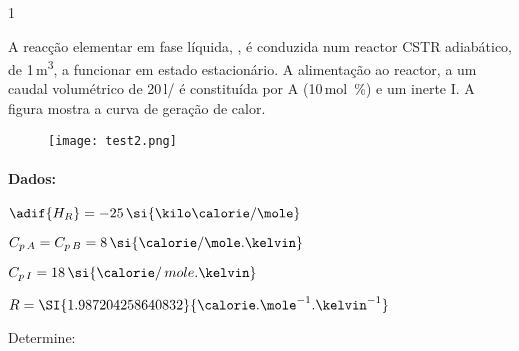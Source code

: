 \documentclass[\mainfilename]{subfiles}
\begin{document}
\begin{questionBox}1{ %
    A reacção elementar em fase líquida, , é conduzida num reactor CSTR adiabático, de 1\,\si{\metre^3}, a funcionar em estado estacionário. A alimentação ao reactor, a um caudal volumétrico de 20\,\si{\litre/\min} é constituída por A (10\,\si{\mole\percent}) e um inerte I. A figura mostra a curva de geração de calor.
    \begin{figure}\centering
        \texttt{[image: test2.png]}
    \end{figure}
} %
    \paragraph*{Dados:}
    \begin{itemize}
        \begin{multicols}{2}
            \vspace{-2ex}
            \item \(\adif{H_R}=-25\,\si{\kilo\calorie/\mole}\)
            \item \(C_{p\,A}=C_{p\,B}=8\,\si{\calorie/\mole.\kelvin}\)
            \item \(C_{p\,I}=18\,\si{\calorie/\,mole.\kelvin}\)
            \item \(R=\SI{1.987204258640832}{\calorie.\mole^{-1}.\kelvin^{-1}}\)
        \end{multicols}
    \end{itemize}
    Determine:


\end{questionBox}
\end{document}
